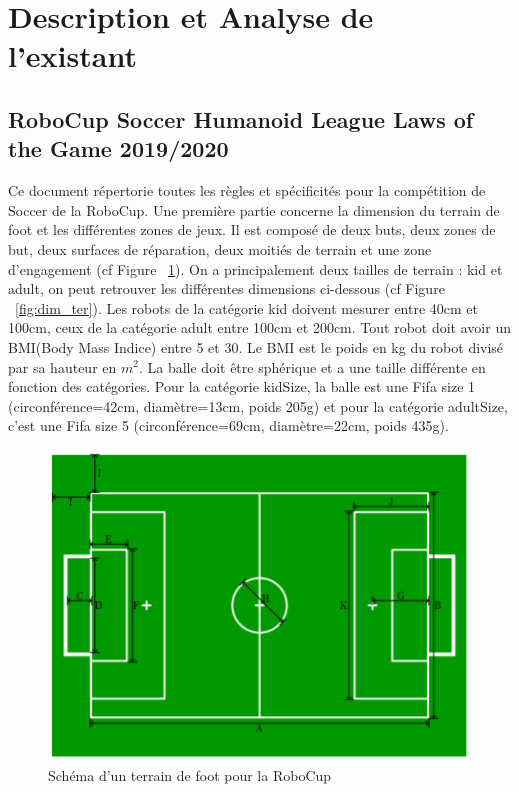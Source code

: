 \documentclass[11pt, a4paper]{article}
\begin{document}
\section{Description et Analyse de l'existant}

\subsection{RoboCup Soccer Humanoid League Laws of the Game 2019/2020}

Ce document \cite{robocuprules} répertorie toutes les règles et spécificités pour la compétition de Soccer de la RoboCup. 
Une première partie concerne la dimension du terrain de foot et les différentes zones de jeux. Il est composé de deux buts, deux zones de but, deux surfaces de réparation, deux moitiés de terrain et une zone d'engagement (cf Figure ~\ref{fig:ter}). 
On a principalement deux tailles de terrain : kid et adult, on peut retrouver les différentes dimensions ci-dessous (cf Figure ~\ref{fig:dim_ter}).
\newline
Les robots de la catégorie kid doivent mesurer entre 40cm et 100cm, ceux de la catégorie adult entre 100cm et 200cm. Tout robot doit avoir un BMI(Body Mass Indice) entre 5 et 30. Le BMI est le poids en kg du robot divisé par sa hauteur en $m^2$.
\newline
La balle doit être sphérique et a une taille différente en fonction des catégories. Pour la catégorie kidSize, la balle est une Fifa size 1 (circonférence=42cm, diamètre=13cm, poids 205g) et pour la catégorie adultSize, c'est une Fifa size 5 (circonférence=69cm, diamètre=22cm, poids 435g).
  \begin{figure}[H]
	\centering
	\includegraphics[scale=1.2]{images/ter.PNG}
	\caption {\cite{robocuprules}
		Schéma d'un terrain de foot pour la RoboCup}
	\label{fig:ter}
\end{figure}
\end{document}
